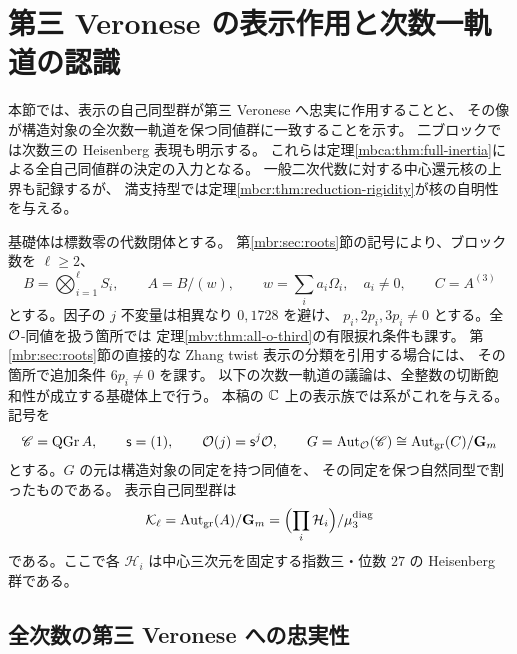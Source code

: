 \section{第三 Veronese の表示作用と次数一軌道の認識}
\label{mbva:sec:automorphisms}

本節では、表示の自己同型群が第三 Veronese へ忠実に作用することと、
その像が構造対象の全次数一軌道を保つ同値群に一致することを示す。
二ブロックでは次数三の Heisenberg 表現も明示する。
これらは定理\ref{mbca:thm:full-inertia}による全自己同値群の決定の入力となる。
一般二次代数に対する中心還元核の上界も記録するが、
満支持型では定理\ref{mbcr:thm:reduction-rigidity}が核の自明性を与える。

基礎体は標数零の代数閉体とする。
第\ref{mbr:sec:roots}節の記号により、ブロック数を $\ell\ge2$、
\[
 B=\bigotimes_{i=1}^{\ell}S_i,\qquad
 A=B/(w),\qquad w=\sum_i a_i\Omega_i,\quad a_i\ne0,\qquad C=A^{(3)}
\]
とする。因子の $j$ 不変量は相異なり $0,1728$ を避け、
$p_i,2p_i,3p_i\ne0$ とする。全 $\mathcal O$-同値を扱う箇所では
定理\ref{mbv:thm:all-o-third}の有限捩れ条件も課す。
第\ref{mbr:sec:roots}節の直接的な Zhang twist 表示の分類を引用する場合には、
その箇所で追加条件 $6p_i\ne0$ を課す。
以下の次数一軌道の議論は、全整数の切断飽和性が成立する基礎体上で行う。
本稿の $\mathbb C$ 上の表示族では系がこれを与える。
記号を
\[
 \mathscr C=\operatorname{QGr}A,\qquad
 \mathsf s=(1),\qquad \mathcal O(j)=\mathsf s^j\mathcal O,\qquad
 G=\operatorname{Aut}_{\mathcal O}(\mathscr C)
     \cong\operatorname{Aut}_{\mathrm{gr}}(C)/\mathbf G_m
\]
とする。$G$ の元は構造対象の同定を持つ同値を、
その同定を保つ自然同型で割ったものである。
表示自己同型群は
\[
 \mathcal K_\ell=
 \operatorname{Aut}_{\mathrm{gr}}(A)/\mathbf G_m
 =\Bigl(\prod_i\mathcal H_i\Bigr)/\mu_3^{\mathrm{diag}}
\]
である。ここで各 $\mathcal H_i$ は中心三次元を固定する指数三・位数 $27$ の
Heisenberg 群である。

\subsection{全次数の第三 Veronese への忠実性}

